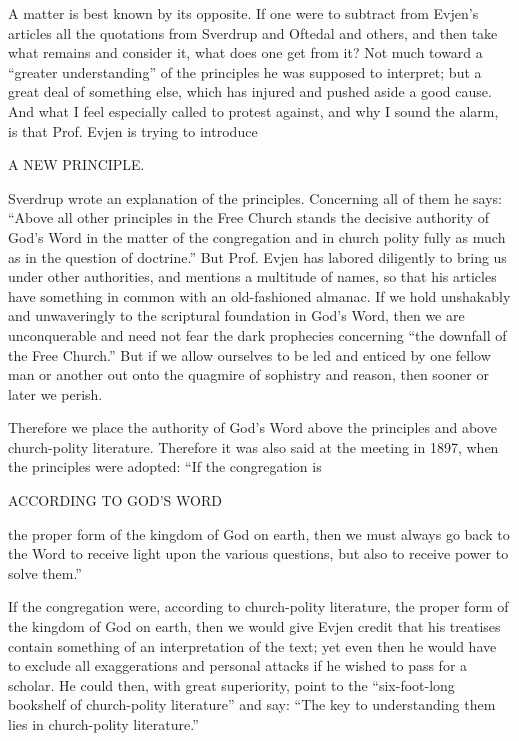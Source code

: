A matter is best known by its opposite. If one were to subtract from Evjen’s articles all the quotations from Sverdrup and Oftedal and others, and then take what remains and consider it, what does one get from it? Not much toward a “greater understanding” of the principles he was supposed to interpret; but a great deal of something else, which has injured and pushed aside a good cause. And what I feel especially called to protest against, and why I sound the alarm, is that Prof. Evjen is trying to introduce

A NEW PRINCIPLE.

Sverdrup wrote an explanation of the principles. Concerning all of them he says: “Above all other principles in the Free Church stands the decisive authority of God’s Word in the matter of the congregation and in church polity fully as much as in the question of doctrine.” But Prof. Evjen has labored diligently to bring us under other authorities, and mentions a multitude of names, so that his articles have something in common with an old-fashioned almanac. If we hold unshakably and unwaveringly to the scriptural foundation in God’s Word, then we are unconquerable and need not fear the dark prophecies concerning “the downfall of the Free Church.” But if we allow ourselves to be led and enticed by one fellow man or another out onto the quagmire of sophistry and reason, then sooner or later we perish.

Therefore we place the authority of God’s Word above the principles and above church-polity literature. Therefore it was also said at the meeting in 1897, when the principles were adopted: “If the congregation is

ACCORDING TO GOD’S WORD

the proper form of the kingdom of God on earth, then we must always go back to the Word to receive light upon the various questions, but also to receive power to solve them.”

If the congregation were, according to church-polity literature, the proper form of the kingdom of God on earth, then we would give Evjen credit that his treatises contain something of an interpretation of the text; yet even then he would have to exclude all exaggerations and personal attacks if he wished to pass for a scholar. He could then, with great superiority, point to the “six-foot-long bookshelf of church-polity literature” and say: “The key to understanding them lies in church-polity literature.”


